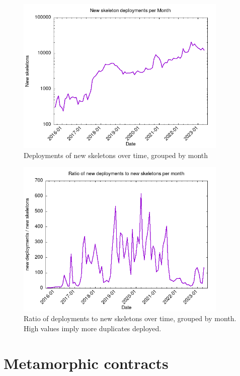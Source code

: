 \begin{figure}[H]
    \centering
    \includegraphics[width=0.9\textwidth]{Figures/analysis/skeletons_per_month.png}
    \caption{Deployments of new skeletons over time, grouped by month}
    \label{fig:skeletons-deploy}
\end{figure}

\begin{figure}[H]
    \centering
    \includegraphics[width=0.9\textwidth]{Figures/analysis/ratio_per_month.png}
    \caption{Ratio of deployments to new skeletons over time, grouped by month. High values imply more duplicates deployed.}
    \label{fig:skeletons-ratio}
\end{figure}


\newpage

\section{Metamorphic contracts}


